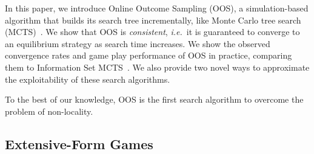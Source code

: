 \documentclass{aamas2015}
\newcounter{vlNoteCounter}
\newcommand{\vlnote}[1]{{\scriptsize \color{blue} $\blacksquare$ \refstepcounter{vlNoteCounter}\textsf{[VL]$_{\arabic{vlNoteCounter}}$:{#1}}}}
\newcommand{\ie}{{\it i.e.}~}
\begin{document}
In this paper, %
we introduce Online Outcome Sampling (OOS), a simulation-based algorithm that builds its search tree incrementally, 
like Monte Carlo tree search (MCTS)~\cite{Coulom06Efficient,UCT,mctssurvey}. 
We show that OOS is {\it consistent}, \ie it is guaranteed to converge to an equilibrium strategy as search 
time increases. %
We show the observed convergence rates and game play performance of OOS in practice, comparing them to Information Set MCTS~\cite{Cowling12ISMCTS,Whitehouse13Integrating}. We also provide two novel ways to approximate the exploitability of these search algorithms. 

To the best of our knowledge, OOS is the first search algorithm to overcome the problem of non-locality. 


\subsection{Extensive-Form Games}
\end{document}
